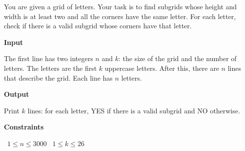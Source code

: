 You are given a grid of letters. Your task is to find subgrids whose height and width is at least two and all the corners have the same letter.
For each letter, check if there is a valid subgrid whose corners have that letter.

\vspace{0.3cm}\noindent\textbf{Input}

The first line has two integers $n$ and $k$: the size of the grid and the number of letters. The letters are the first $k$ uppercase letters.
After this, there are $n$ lines that describe the grid. Each line has $n$ letters.

\vspace{0.3cm}\noindent\textbf{Output}

Print $k$ lines: for each letter, YES if there is a valid subgrid and NO otherwise.

\vspace{0.3cm}\noindent\textbf{Constraints}

\textbullet\ $1 \le n \le 3000$
\textbullet\ $1 \le k \le 26$